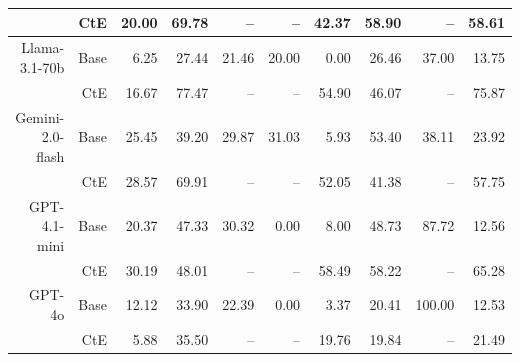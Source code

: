 \begin{table}[!t]
\begin{tabular}{r r !{\color{white!80!black} \vline} r r r r r !{\color{white!80!black} \vline} r r r}
 & CtE & \textcolor{blue!60!black}{20.00} & \textcolor{blue!60!black}{69.78} & \textcolor{blue!60!black}{--} & \textcolor{blue!60!black}{--} & \textcolor{blue!60!black}{42.37} & \textcolor{blue!60!black}{58.90} & \textcolor{blue!60!black}{--} & \textcolor{blue!60!black}{58.61} \\ \midrule
 \sf Llama-3.1-70b & Base & 6.25 & \textcolor{blue!60!black}{27.44} & \textcolor{blue!60!black}{21.46} & \textcolor{blue!60!black}{20.00} & \textcolor{blue!60!black}{0.00} & 26.46 & \textcolor{blue!60!black}{37.00} & \textcolor{blue!60!black}{13.75} \\
 & CtE & 16.67 & \textcolor{blue!60!black}{77.47} & \textcolor{blue!60!black}{--} & \textcolor{blue!60!black}{--} & \textcolor{blue!60!black}{54.90} & 46.07 & \textcolor{blue!60!black}{--} & \textcolor{blue!60!black}{75.87} \\ \midrule
 \sf Gemini-2.0-flash & Base & \textcolor{blue!60!black}{25.45} & \textcolor{blue!60!black}{39.20} & \textcolor{blue!60!black}{29.87} & \textcolor{blue!60!black}{31.03} & \textcolor{blue!60!black}{5.93} & \textcolor{blue!60!black}{53.40} & \textcolor{blue!60!black}{38.11} & \textcolor{blue!60!black}{23.92} \\
 & CtE & \textcolor{blue!60!black}{28.57} & \textcolor{blue!60!black}{69.91} & \textcolor{blue!60!black}{--} & \textcolor{blue!60!black}{--} & \textcolor{blue!60!black}{52.05} & \textcolor{blue!60!black}{41.38} & \textcolor{blue!60!black}{--} & \textcolor{blue!60!black}{57.75} \\ \midrule
 \sf GPT-4.1-mini & Base & \textcolor{blue!60!black}{20.37} & \textcolor{blue!60!black}{47.33} & \textcolor{blue!60!black}{30.32} & \textcolor{blue!60!black}{0.00} & \textcolor{blue!60!black}{8.00} & \textcolor{blue!60!black}{48.73} & \textcolor{blue!60!black}{87.72} & \textcolor{blue!60!black}{12.56} \\
 & CtE & \textcolor{blue!60!black}{30.19} & \textcolor{blue!60!black}{48.01} & \textcolor{blue!60!black}{--} & \textcolor{blue!60!black}{--} & \textcolor{blue!60!black}{58.49} & \textcolor{blue!60!black}{58.22} & \textcolor{blue!60!black}{--} & \textcolor{blue!60!black}{65.28} \\ \midrule
 \sf GPT-4o & Base & \textcolor{blue!60!black}{12.12} & \textcolor{blue!60!black}{33.90} & \textcolor{blue!60!black}{22.39} & \textcolor{blue!60!black}{0.00} & \textcolor{blue!60!black}{3.37} & \textcolor{blue!60!black}{20.41} & \textcolor{blue!60!black}{100.00} & \textcolor{blue!60!black}{12.53} \\
 & CtE & \textcolor{blue!60!black}{5.88} & \textcolor{blue!60!black}{35.50} & \textcolor{blue!60!black}{--} & \textcolor{blue!60!black}{--} & \textcolor{blue!60!black}{19.76} & \textcolor{blue!60!black}{19.84} & \textcolor{blue!60!black}{--} & \textcolor{blue!60!black}{21.49} \\ \midrule

\end{tabular}
\end{table}
